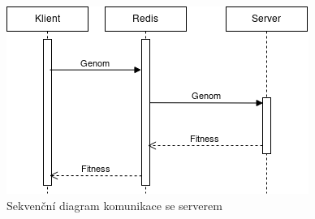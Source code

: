 
\begin{figure}[h!]
	\centering
	\includegraphics[width=0.7\linewidth]{server_use_case}
	\caption{Sekvenční diagram komunikace se serverem}
	\label{fig:serverusecase}
\end{figure}
